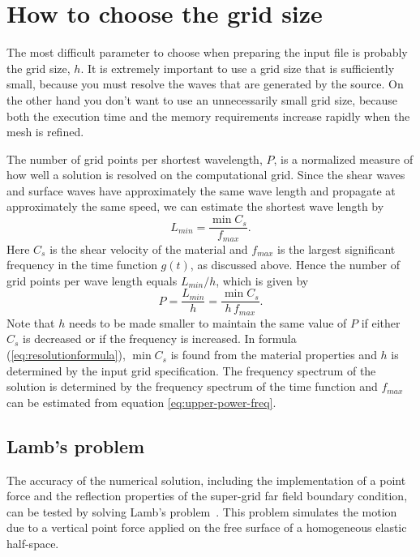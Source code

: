 \documentclass[11pt]{report}
\begin{document}
\section{How to choose the grid size} \label{sec:grid-size}

The most difficult parameter to choose when preparing the input file is probably the grid size,
$h$. It is extremely important to use a grid size that is sufficiently small, because you must resolve
the waves that are generated by the source. On the other hand you don't want to use an
unnecessarily small grid size, because both the execution time and the memory requirements
increase rapidly when the mesh is refined.

The number of grid points per shortest wavelength, $P$, is a normalized measure of how well a
solution is resolved on the computational grid. Since the shear waves and surface waves have
approximately the same wave length and propagate at approximately the same speed, we can estimate
the shortest wave length by
\[
 L_{min} = \dfrac{\min C_s}{f_{max}}.
\]
Here $C_s$ is the shear velocity of the material and $f_{max}$ is the largest significant frequency
in the time function $g(t)$, as discussed above. Hence the number of grid points per wave length
equals $L_{min}/h$, which is given by
%
\begin{equation}\label{eq:resolutionformula}
  P = \frac{L_{min}}{h} = \dfrac{\min C_s}{h\,f_{max}}. 
\end{equation}
Note that $h$ needs to be made smaller to maintain the same value of $P$ if either $C_s$ is
decreased or if the frequency is increased. In formula (\ref{eq:resolutionformula}), $\min C_s$ is
found from the material properties and $h$ is determined by the input grid specification.  The
frequency spectrum of the solution is determined by the frequency spectrum of the time
function and $f_{max}$ can be estimated from equation \eqref{eq:upper-power-freq}.

\subsection{Lamb's problem}
\label{sec:lamb}

The accuracy of the numerical solution, including the implementation of a point force and the
reflection properties of the super-grid far field boundary condition, can be tested by solving
Lamb's problem~\cite{Lamb_1904}. This problem simulates the motion due to a vertical point force
applied on the free surface of a homogeneous elastic half-space.
\end{document}
